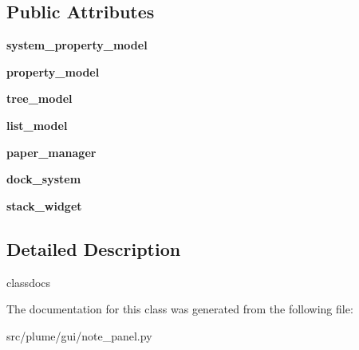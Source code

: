 \subsection*{Public Attributes}
\begin{DoxyCompactItemize}
\item 
{\bfseries system\+\_\+property\+\_\+model}\hypertarget{classplume-creator_1_1src_1_1plume_1_1gui_1_1note__panel_1_1_note_panel_ac7a9d527ba301f852a3c486a7a12d1cf}{}\label{classplume-creator_1_1src_1_1plume_1_1gui_1_1note__panel_1_1_note_panel_ac7a9d527ba301f852a3c486a7a12d1cf}

\item 
{\bfseries property\+\_\+model}\hypertarget{classplume-creator_1_1src_1_1plume_1_1gui_1_1note__panel_1_1_note_panel_a355722c53c67a49bd182729108e780ed}{}\label{classplume-creator_1_1src_1_1plume_1_1gui_1_1note__panel_1_1_note_panel_a355722c53c67a49bd182729108e780ed}

\item 
{\bfseries tree\+\_\+model}\hypertarget{classplume-creator_1_1src_1_1plume_1_1gui_1_1note__panel_1_1_note_panel_a739795e76cfff3435bf4ec3083100f3f}{}\label{classplume-creator_1_1src_1_1plume_1_1gui_1_1note__panel_1_1_note_panel_a739795e76cfff3435bf4ec3083100f3f}

\item 
{\bfseries list\+\_\+model}\hypertarget{classplume-creator_1_1src_1_1plume_1_1gui_1_1note__panel_1_1_note_panel_a16a52b99df259d37c6dde2892985a662}{}\label{classplume-creator_1_1src_1_1plume_1_1gui_1_1note__panel_1_1_note_panel_a16a52b99df259d37c6dde2892985a662}

\item 
{\bfseries paper\+\_\+manager}\hypertarget{classplume-creator_1_1src_1_1plume_1_1gui_1_1note__panel_1_1_note_panel_a55dad104c71385ffef610f7d961e2641}{}\label{classplume-creator_1_1src_1_1plume_1_1gui_1_1note__panel_1_1_note_panel_a55dad104c71385ffef610f7d961e2641}

\item 
{\bfseries dock\+\_\+system}\hypertarget{classplume-creator_1_1src_1_1plume_1_1gui_1_1note__panel_1_1_note_panel_a5493811259771992565b87746daf3c92}{}\label{classplume-creator_1_1src_1_1plume_1_1gui_1_1note__panel_1_1_note_panel_a5493811259771992565b87746daf3c92}

\item 
{\bfseries stack\+\_\+widget}\hypertarget{classplume-creator_1_1src_1_1plume_1_1gui_1_1note__panel_1_1_note_panel_abd906fe8703cefd9d722b102a8e28240}{}\label{classplume-creator_1_1src_1_1plume_1_1gui_1_1note__panel_1_1_note_panel_abd906fe8703cefd9d722b102a8e28240}

\end{DoxyCompactItemize}


\subsection{Detailed Description}
classdocs 

The documentation for this class was generated from the following file\+:\begin{DoxyCompactItemize}
\item 
src/plume/gui/note\+\_\+panel.\+py\end{DoxyCompactItemize}
